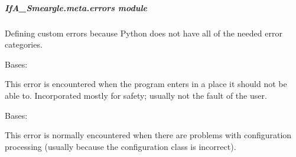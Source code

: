 \documentclass[letterpaper,10pt,english]{sphinxmanual}
\begin{document}
\subparagraph{IfA\_Smeargle.meta.errors module}
\label{\detokenize{python_docstrings/IfA_Smeargle.meta.errors:module-IfA_Smeargle.meta.errors}}\label{\detokenize{python_docstrings/IfA_Smeargle.meta.errors:ifa-smeargle-meta-errors-module}}\label{\detokenize{python_docstrings/IfA_Smeargle.meta.errors::doc}}
Defining custom errors because Python does not have all of the needed error
categories.

\begin{fulllineitems}
\label{\detokenize{python_docstrings/IfA_Smeargle.meta.errors:IfA_Smeargle.meta.errors.BrokenLogicError}}
Bases: {\hyperref[\detokenize{python_docstrings/IfA_Smeargle.meta.errors:IfA_Smeargle.meta.errors.Smeargle_Exception}]{}}

This error is encountered when the program enters in a place it should
not be able to. Incorporated mostly for safety; usually not the fault of
the user.

\end{fulllineitems}


\begin{fulllineitems}
\label{\detokenize{python_docstrings/IfA_Smeargle.meta.errors:IfA_Smeargle.meta.errors.ConfigurationError}}
Bases: {\hyperref[\detokenize{python_docstrings/IfA_Smeargle.meta.errors:IfA_Smeargle.meta.errors.Smeargle_Exception}]{}}

This error is normally encountered when there are problems with
configuration processing (usually because the configuration class is
incorrect).

\end{fulllineitems}

\end{document}
